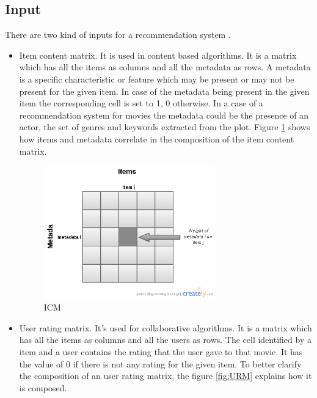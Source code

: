 \subsection{Input}
\label{sec:Input}

There are two kind of inputs for a recommendation system \cite{thesis-andreia}. 
\begin{itemize}
\item Item content matrix. It is used in content based algorithms. It is a matrix which has all the items as columns and all the metadata as rows. A metadata is a specific characteristic or feature which may be present or may not be present for the given item. In case of the metadata being present in the given item the corresponding cell is set to 1, 0 otherwise. In a case of a recommendation system for movies the metadata could be the presence of an actor, the set of genres and keywords extracted from the plot. Figure \ref{fig:ICM} shows how items and metadata correlate in the composition of the item content matrix.

  \begin{figure}
    \centering
    \includegraphics[width=0.7\textwidth]{figures/ICM.png}
    \caption{ICM}
    \label{fig:ICM}
  \end{figure}
 
\item User rating matrix. It's used for collaborative algorithms. It is a matrix which has all the items as columns and all the users as rows. The cell identified by a item and a user contains the rating that the user gave to that movie. It has the value of 0 if there is not any rating for the given item. To better clarify the composition of an user rating matrix, the figure \ref{fig:URM} explains how it is composed.


\end{itemize}
